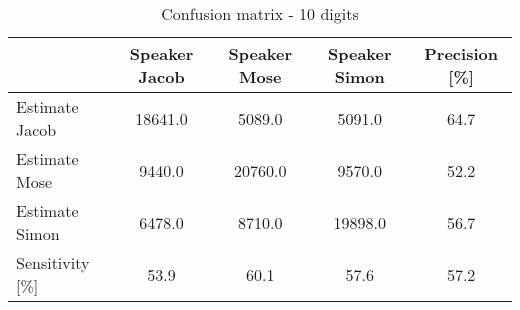 \begin{table}[H]                                                    
\centering                                                          
\begin{tabular}{|l|c|c|c|c|}                                        
\hline                                                              
  & Speaker Jacob & Speaker Mose & Speaker Simon & Precision [\%] \\
\hline                                                              
Estimate Jacob & 18641.0 & 5089.0 & 5091.0 & 64.7 \\                
\hline                                                              
Estimate Mose & 9440.0 & 20760.0 & 9570.0 & 52.2 \\                 
\hline                                                              
Estimate Simon & 6478.0 & 8710.0 & 19898.0 & 56.7 \\                
\hline                                                              
Sensitivity [\%] & 53.9 & 60.1 & 57.6 & 57.2 \\                     
\hline                                                              
\end{tabular}                                                       
\caption{Confusion matrix - 10 digits}                              
\label{table:PGM_conf_10}                                           
\end{table}
